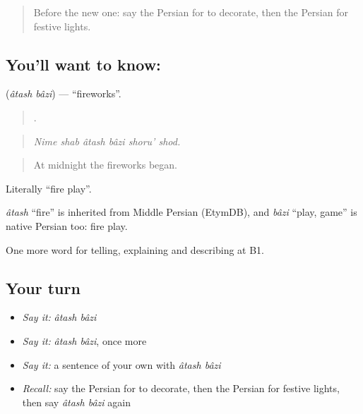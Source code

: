 \label{lesson:FA-C342-atash-bazi}



\begin{quote}
Before the new one: say the Persian for to decorate, then the Persian for festive lights.
\end{quote}

\subsection*{You'll want to know:  }
\textbf{ } (\emph{âtash bâzi}) — \textquotedblleft{}fireworks\textquotedblright{}.

\begin{quote}
     .
\end{quote}

\begin{quote}
\emph{Nime shab âtash bâzi shoru' shod.}
\end{quote}

\begin{quote}
At midnight the fireworks began.
\end{quote}

Literally \textquotedblleft{}fire play\textquotedblright{}.

\begin{cousinweb}
\emph{âtash} \textquotedblleft{}fire\textquotedblright{} is inherited from Middle Persian (EtymDB), and \emph{bâzi} \textquotedblleft{}play, game\textquotedblright{} is native Persian too: fire play.
\end{cousinweb}

\begin{grammarlens}[title={What you've built}]
One more word for telling, explaining and describing at B1.
\end{grammarlens}

\subsection*{Your turn}
\begin{itemize}
\raggedright
  \item \emph{Say it:} \emph{âtash bâzi}
  \item \emph{Say it:} \emph{âtash bâzi}, once more
  \item \emph{Say it:} a sentence of your own with \emph{âtash bâzi}
  \item \emph{Recall:} say the Persian for to decorate, then the Persian for festive lights, then say \emph{âtash bâzi} again
\end{itemize}


